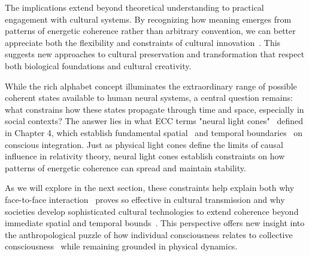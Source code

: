 The implications extend beyond theoretical understanding to practical engagement with cultural systems. By recognizing how meaning emerges from patterns of energetic coherence rather than arbitrary convention, we can better appreciate both the flexibility and constraints of cultural innovation~\cite{rappaport1999ritual,ingold2011being}. This suggests new approaches to cultural preservation and transformation that respect both biological foundations and cultural creativity.

While the rich alphabet concept illuminates the extraordinary range of possible coherent states available to human neural systems, a central question remains: what constrains how these states propagate through time and space, especially in social contexts? The answer lies in what ECC terms "neural light cones"~ defined in Chapter 4, which establish fundamental spatial~ and temporal boundaries~ on conscious integration. Just as physical light cones define the limits of causal influence in relativity theory, neural light cones establish constraints on how patterns of energetic coherence can spread and maintain stability.

As we will explore in the next section, these constraints help explain both why face-to-face interaction~ proves so effective in cultural transmission and why societies develop sophisticated cultural technologies to extend coherence beyond immediate spatial and temporal bounds~\cite{hutchins1995cognition,rappaport1999ritual}. This perspective offers new insight into the anthropological puzzle of how individual consciousness relates to collective consciousness~ while remaining grounded in physical dynamics.
